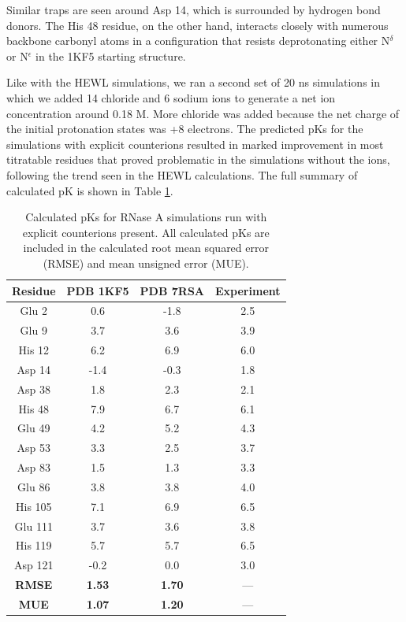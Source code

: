 Similar traps are seen around Asp 14, which is surrounded by hydrogen bond
donors. The His 48 residue, on the other hand, interacts closely with numerous
backbone carbonyl atoms in a configuration that resists deprotonating either
N$^\delta$ or N$^\epsilon$ in the 1KF5 starting structure.

Like with the HEWL simulations, we ran a second set of 20 ns simulations in
which we added 14 chloride and 6 sodium ions to generate a net ion concentration
around 0.18 M. More chloride was added because the net charge of the initial
protonation states was +8 electrons. The predicted pKs for the
simulations with explicit counterions resulted in marked improvement in most
titratable residues that proved problematic in the simulations without the ions,
following the trend seen in the HEWL calculations. The full summary of
calculated pK is shown in Table \ref{tbl4:rnase_a_ions_pkas}.
\begin{table}
   \caption{Calculated pKs for RNase A simulations run with explicit
            counterions present. All calculated pKs are included in the
            calculated root mean squared error (RMSE) and mean unsigned error
            (MUE).}
   \begin{tabular}{cccc}
      Residue & PDB 1KF5 & PDB 7RSA & Experiment
                               \cite{Baker_ArchBiochemBiophys_1996_v327_p189} \\
      \hline
      Glu 2 & 0.6 & -1.8 & 2.5 \\
      Glu 9 & 3.7 & 3.6 & 3.9 \\
      His 12 & 6.2 & 6.9 & 6.0 \\
      Asp 14 & -1.4 & -0.3 & 1.8 \\
      Asp 38 & 1.8 & 2.3 & 2.1 \\
      His 48 & 7.9 & 6.7 & 6.1 \\
      Glu 49 & 4.2 & 5.2 & 4.3 \\
      Asp 53 & 3.3 & 2.5 & 3.7 \\
      Asp 83 & 1.5 & 1.3 & 3.3 \\
      Glu 86 & 3.8 & 3.8 & 4.0 \\
      His 105 & 7.1 & 6.9 & 6.5 \\
      Glu 111 & 3.7 & 3.6 & 3.8 \\
      His 119 & 5.7 & 5.7 & 6.5 \\
      Asp 121 & -0.2 & 0.0 & 3.0 \\
      \hline
      \hline
      \textbf{RMSE} & \textbf{1.53} & \textbf{1.70} & --- \\
      \textbf{MUE} & \textbf{1.07} & \textbf{1.20} & --- \\
      \hline
   \end{tabular}
   \label{tbl4:rnase_a_ions_pkas}
\end{table}

